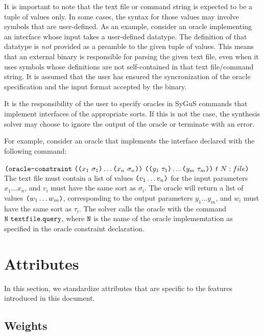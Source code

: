 \documentclass[english,a4paper,10pt]{article}
\begin{document}
It is important to note that the text file or command string is expected to be
a tuple of values only.
In some cases, 
the syntax for those values may involve symbols that are user-defined.
As an example, consider an oracle
implementing an interface whose input takes a user-defined datatype.
The definition of that datatype is \emph{not} provided as a preamble
to the given tuple of values.
This means that an external binary is responsible for
parsing the given text file, even when it uses symbols whose definitions
are not self-contained in that text file/command string. 
It is assumed that
the user has ensured the syncronization of the oracle specification
and the input format accepted by the binary.

It is the responsibility of the user to specify oracles in
SyGuS commands that implement interfaces of the appropriate sorts.
If this is not the case, the synthesis solver may choose to ignore the output
of the oracle or terminate with an error.

For example, consider an oracle that implements the interface declared with the following command:\\\\
$\texttt{(}\texttt{oracle-constraint}\mbox{ } 
\texttt{(}\texttt{(}x_1\mbox{ }\sigma_1\texttt{)} \ldots \texttt{(}x_n\mbox{ }\sigma_n\texttt{)}\texttt{)}\mbox{ }
\texttt{(}\texttt{(}y_{1}\mbox{ }\tau_{1}\texttt{)} \ldots \texttt{(}y_{m}\mbox{ }\tau_{m}\texttt{)}\texttt{)}  \mbox{ } t\mbox{ } N :file\texttt{)}$ \\

The text file must contain a list of values $\texttt{(}v_1 \ldots v_n\texttt{)}$ for the input parameters $x_1 \ldots x_n$, and $v_i$ must have the same sort as $\sigma_i$.
The oracle will return a list of values $\texttt{(}w_{1} \ldots w_{m}\texttt{)}$, corresponding to the output parameters $y_{1} \ldots y_{m}$, and $w_i$ must have the same sort as $\tau_i$.
%
The solver calls the oracle with the command ${\tt N \,\,textfile.query}$, where ${\tt N}$ is the name of the oracle implememtation as specified in the oracle constraint declaration.

\section{Attributes}
\label{sec:attr}

In this section, we standardize attributes that are specific to
the features introduced in this document.

\subsection{Weights}%
\label{sec:attr-weights}
\end{document}
